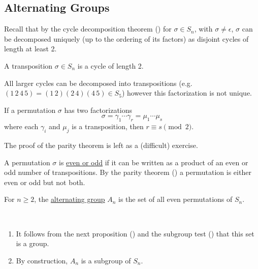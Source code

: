 \documentclass[11pt]{article}
\begin{document}
\subsection{Alternating Groups}

Recall that by the cycle decomposition theorem () for $\sigma\in S_n$, with $\sigma\neq\epsilon$, $\sigma$ can be decomposed uniquely (up to the ordering of its factors) as disjoint cycles of length at least 2.

\begin{definition}[Transpositions]
    A transposition $\sigma\in S_n$ is a cycle of length 2.
\end{definition}

\begin{remark}
    All larger cycles can be decomposed into transpositions (e.g. $(1\,2\,4\,5)=(1\,2)(2\,4)(4\,5)\in S_5$) however this factorization is not unique.
\end{remark}

\begin{theorem}
    If a permutation $\sigma$ has two factorizations
    \[\sigma=\gamma_1\cdots\gamma_r=\mu_1\cdots\mu_s\]
    where each $\gamma_i$ and $\mu_j$ is a transposition, then $r\equiv s\pmod{2}$.
\end{theorem}

\proof The proof of the parity theorem is left as a (difficult) exercise.

\begin{definition}
    A permutation $\sigma$ is \ul{even or odd} if it can be written as a product of an even or odd number of transpositions. By the parity theorem () a permutation is either even or odd but not both.
\end{definition}

\begin{definition}
    For $n\geq2$, the \ul{alternating group} $A_n$ is the set of all even permutations of $S_n$.
\end{definition}

\begin{note}\,
    \begin{enumerate}
        \item It follows from the next proposition () and the subgroup test () that this set is a group.
        \item By construction, $A_n$ is a subgroup of $S_n$.
    \end{enumerate}
\end{note}
\end{document}
